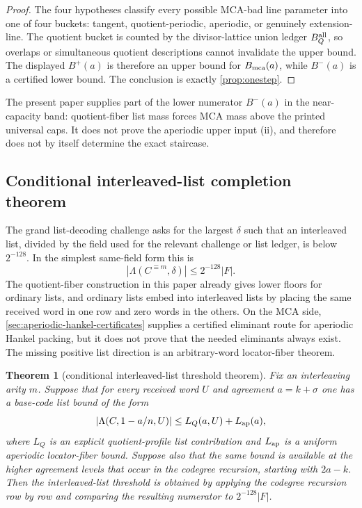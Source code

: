 \documentclass[11pt]{article}
\newtheorem{theorem}{Theorem}[section]
\theoremstyle{definition}
\theoremstyle{remark}
\begin{document}
\begin{proof}
The four hypotheses classify every possible MCA-bad line parameter into one of
four buckets: tangent, quotient-periodic, aperiodic, or genuinely extension-line.
The quotient bucket is counted by the divisor-lattice union ledger $B_Q^{\rm all}$,
so overlaps or simultaneous quotient descriptions cannot invalidate the upper
bound.  The displayed $B^+(a)$ is therefore an upper bound for $B_{\rm mca}(a)$, while
$B^-(a)$ is a certified lower bound.  The conclusion is exactly
\cref{prop:onestep}.
\end{proof}

The present paper supplies part of the lower numerator $B^-(a)$ in the
near-capacity band: quotient-fiber list mass forces MCA mass above the printed
universal caps.  It does not prove the aperiodic upper input (ii), and therefore
does not by itself determine the exact staircase.

\subsection{Conditional interleaved-list completion theorem}

The grand list-decoding challenge asks for the largest $\delta$ such that an
interleaved list, divided by the field used for the relevant challenge or list
ledger, is below $2^{-128}$.  In the simplest same-field form this is
\[
        |\Lambda(C^{\equiv m},\delta)|\le 2^{-128}|F| .
\]
The quotient-fiber construction in this paper already gives lower floors for
ordinary lists, and ordinary lists embed into interleaved lists by placing the
same received word in one row and zero words in the others.  On the MCA side,
\cref{sec:aperiodic-hankel-certificates} supplies a certified eliminant route
for aperiodic Hankel packing, but it does not prove that the needed eliminants
always exist.  The missing positive list direction is an arbitrary-word
locator-fiber theorem.

\begin{theorem}[conditional interleaved-list threshold theorem]\label{thm:conditional-list}
Fix an interleaving arity $m$.  Suppose that for every received word $U$ and
agreement $a=k+\sigma$ one has a base-code list bound of the form
\[
        |\Lambda(C,1-a/n,U)|
        \le
        L_Q(a,U)+L_{\rm ap}(a),
\]
where $L_Q$ is an explicit quotient-profile list contribution and
$L_{\rm ap}$ is a uniform aperiodic locator-fiber bound.  Suppose also that the
same bound is available at the higher agreement levels that occur in the
codegree recursion, starting with $2a-k$.  Then the interleaved-list threshold is
obtained by applying the codegree recursion row by row and comparing the
resulting numerator to $2^{-128}|F|$.
\end{theorem}
\end{document}
